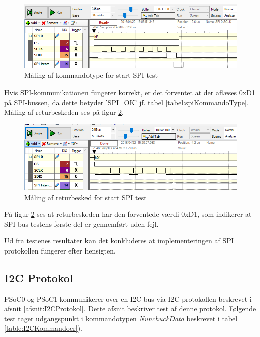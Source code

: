 \begin{figure}[H]
	\centering
	\includegraphics[width=\textwidth]{Test/images/SPItest/SPItestkommandotype}
	\caption{Måling af kommandotype for start SPI test}
	\label{fig:SPItestkommandotype}
\end{figure}

Hvis SPI-kommunikationen fungerer korrekt, er det forventet at der aflæses 0xD1 på SPI-bussen, da dette betyder 'SPI\_OK' jf. tabel \ref{tabel:spiKommandoType}. Måling af returbeskeden ses på figur \ref{fig:SPItestSPIOK}.

\begin{figure}[H]
	\centering
	\includegraphics[width=\textwidth]{Test/images/SPItest/SPItestSPIOK1}
	\caption{Måling af returbesked for start SPI test} 
	\label{fig:SPItestSPIOK}
\end{figure}

På figur \ref{fig:SPItestSPIOK} ses at returbeskeden har den forventede værdi 0xD1, som indikerer at SPI bus testens første del er gennemført uden fejl.

Ud fra testenes resultater kan det konkluderes at implementeringen af SPI protokollen fungerer efter hensigten.



\subsection{I2C Protokol}
PSoC0 og PSoC1 kommunikerer over en I2C bus via I2C protokollen beskrevet i afsnit \ref{afsnit:I2CProtokol}. Dette afsnit beskriver test af denne protokol. Følgende test tager udgangspunkt i kommandotypen \textit{NunchuckData} beskrevet i tabel \ref{table:I2CKommandoer}).

